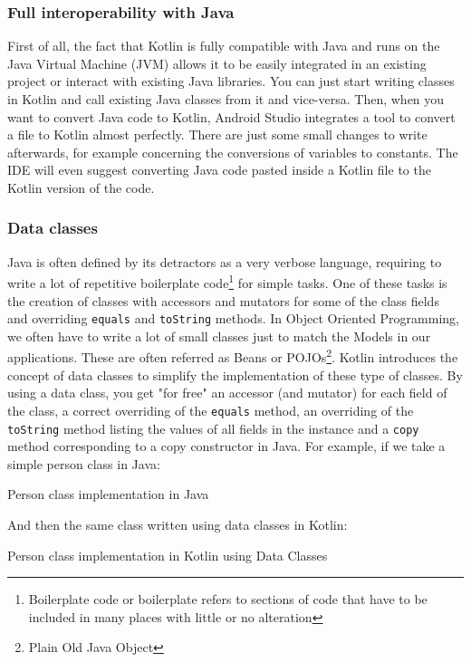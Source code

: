 \documentclass[11pt,a4paper]{report}
\newenvironment{code}{\captionsetup{type=listing}}{}
\begin{document}
\subsubsection{Full interoperability with Java}
First of all, the fact that Kotlin is fully compatible with Java and runs on the Java Virtual Machine (JVM) allows it to be easily integrated in an existing project or interact with existing Java libraries. You can just start writing classes in Kotlin and call existing Java classes from it and vice-versa. Then, when you want to convert Java code to Kotlin, Android Studio integrates a tool to convert a file to Kotlin almost perfectly. There are just some small changes to write afterwards, for example concerning the conversions of variables to constants. The IDE will even suggest converting Java code pasted inside a Kotlin file to the Kotlin version of the code.
\subsubsection{Data classes}
Java is often defined by its detractors as a very verbose language, requiring to write a lot of repetitive boilerplate code\footnote{Boilerplate code or boilerplate refers to sections of code that have to be included in many places with little or no alteration\cite{wiki:define:boilerplate}} for simple tasks. One of these tasks is the creation of classes with accessors and mutators for some of the class fields and overriding \verb+equals+ and \verb+toString+ methods. In Object Oriented Programming, we often have to write a lot of small classes just to match the Models in our applications. These are often referred as Beans or POJOs\footnote{Plain Old Java Object}. Kotlin introduces the concept of data classes\cite{kotlin:doc:data_classes} to simplify the implementation of these type of classes. By using a data class, you get "for free" an accessor (and mutator) for each field of the class, a correct overriding of the \verb+equals+ method, an overriding of the \verb+toString+ method listing the values of all fields in the instance and a \verb+copy+ method corresponding to a copy constructor in Java. For example, if we take a simple person class in Java:
\begin{code}
\caption{Person class implementation in Java}	
\end{code}

And then the same class written using data classes in Kotlin:
\begin{code}
\caption{Person class implementation in Kotlin using Data Classes}	
\end{code}
\end{document}
